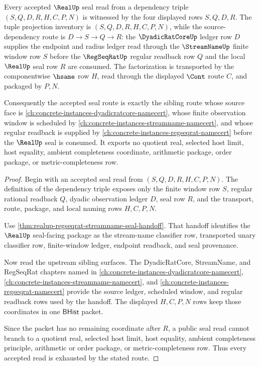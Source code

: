 \begin{theorem}
\label{thm:real-regseq-streamname-seal-route-exhaustion}
Every accepted $\RealUp$ seal read from a dependency triple
$(S,Q,D,R,H,C,P,N)$ is witnessed by the four displayed rows
$S,Q,D,R$. The tuple projection inventory is $(S,Q,D,R,H,C,P,N)$, while the
source-dependency route is $D \to S \to Q \to R$: the $\DyadicRatCoreUp$
ledger row $D$ supplies the endpoint and radius ledger read through the
$\StreamNameUp$ finite window row $S$ before the $\RegSeqRatUp$ regular
readback row $Q$ and the local $\RealUp$ seal row $R$ are consumed. The
factorization is transported by the componentwise $\hsame$ row $H$, read
through the displayed $\Cont$ route $C$, and packaged by $P,N$.

Consequently the accepted seal route is exactly the sibling route whose source
face is \autoref{ch:concrete-instances-dyadicratcore-namecert}, whose finite
observation window is scheduled by
\autoref{ch:concrete-instances-streamname-namecert}, and whose regular
readback is supplied by \autoref{ch:concrete-instances-regseqrat-namecert}
before the $\RealUp$ seal is consumed. It exports no quotient real, selected
host limit, host equality, ambient completeness coordinate, arithmetic package,
order package, or metric-completeness row.
\end{theorem}
\begin{proof}
Begin with an accepted seal read from $(S,Q,D,R,H,C,P,N)$. The definition of
the dependency triple exposes only the finite window row $S$, regular
rational readback $Q$, dyadic observation ledger $D$, seal row $R$, and the
transport, route, package, and local naming rows $H,C,P,N$.

Use \autoref{thm:realup-regseqrat-streamname-seal-handoff}. That handoff
identifies the $\RealUp$ seal-facing package as the stream-name classifier
row, transported unary classifier row, finite-window ledger, endpoint
readback, and seal provenance.

Now read the upstream sibling surfaces. The DyadicRatCore, StreamName, and
RegSeqRat chapters named in
\autoref{ch:concrete-instances-dyadicratcore-namecert},
\autoref{ch:concrete-instances-streamname-namecert}, and
\autoref{ch:concrete-instances-regseqrat-namecert} provide the source ledger,
scheduled window, and regular readback rows used by the handoff. The displayed
$H,C,P,N$ rows keep those coordinates in one $\mathsf{BHist}$ packet.

Since the packet has no remaining coordinate after $R$, a public seal read
cannot branch to a quotient real, selected host limit, host equality, ambient
completeness principle, arithmetic or order package, or metric-completeness
row. Thus every accepted read is exhausted by the stated route.
\end{proof}

